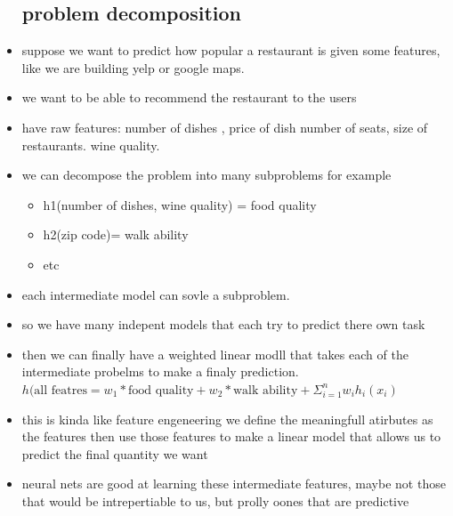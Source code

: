 \documentclass{article}
\begin{document}
\begin{itemize}
\subsection{problem decomposition}
\item suppose we want to predict how popular a restaurant is given some features, like we are building yelp or google maps. 
\item we want to be able to recommend the restaurant to the users 
\item have raw features: number of dishes , price of dish number of seats, size of restaurants. wine quality.
\item we can decompose the problem into many subproblems for example 
\begin{itemize}
    \item h1(number of dishes, wine quality) = food quality
    \item h2(zip code)= walk ability
    \item etc
\end{itemize}
\item each intermediate model can sovle a subproblem. 
\item so we have many indepent models that each try to predict there own task 
\item then we can finally have a weighted linear modll that takes each of the intermediate probelms to make a finaly prediction. $h(\text{all featres}=w_1*\text{food quality}+w_2*\text{walk ability} +\Sigma_{i=1}^{n}w_ih_i(x_i)$
\item this is kinda like feature engeneering we define the meaningfull atirbutes as the features then use those features to make a linear model that allows us to predict the final quantity we want 
\item neural nets are good at learning these intermediate features, maybe not those that would be intrepertiable to us, but prolly oones that are predictive

\end{itemize}
\end{document}
